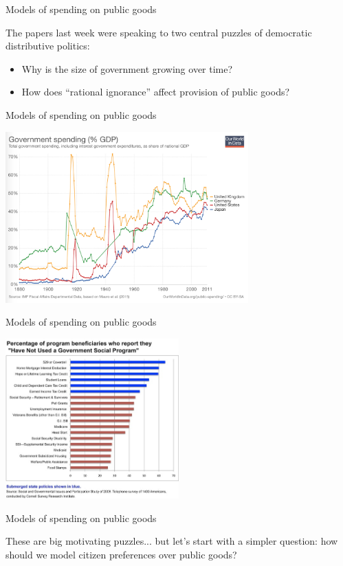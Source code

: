\documentclass[aspectratio=169]{beamer}
\begin{document}
\begin{frame}{Models of spending on public goods}

\Large 

The papers last week were speaking to two central puzzles of democratic distributive politics:

\begin{itemize}
\item Why is the size of government growing over time?

\item How does ``rational ignorance'' affect provision of public goods?
\end{itemize}


\end{frame}
\begin{frame}{Models of spending on public goods}


\centering
\includegraphics[width=0.70\textwidth]{gov_spending.png}

\end{frame}

\begin{frame}{Models of spending on public goods}


\centering
\includegraphics[width=0.50\textwidth]{mettler.png}

\end{frame}
\begin{frame}{Models of spending on public goods}

\Large
These are big motivating puzzles... \pause but let's start with a simpler question: how should we model citizen preferences over public goods?

\end{frame}
\end{document}
